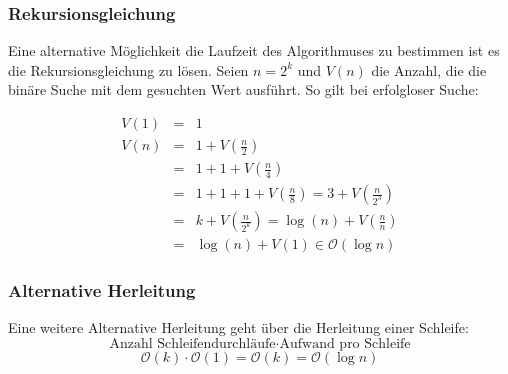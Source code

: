 \subsubsection{Rekursionsgleichung}
Eine alternative Möglichkeit die Laufzeit des Algorithmuses zu bestimmen ist es die Rekursionsgleichung zu lösen.
Seien \(n=2^{k}\) und \(V(n)\) die Anzahl, die die binäre Suche mit dem gesuchten Wert ausführt.
So gilt bei erfolgloser Suche:

\begin{eqnarray*}
	V(1) &=& 1 \\
	V(n) &=& 1+ V(\frac{n}{2}) \\
	&=& 1+1+V(\frac{n}{4}) \\
	&=& 1+1+1+V(\frac{n}{8}) = 3 +V(\frac{n}{2^{3}}) \\
	&=& k+V(\frac{n}{2^{k}}) = \log(n) + V(\frac{n}{n})\\
	&=& \log(n) + V(1) \in \mathcal{O}(\log n)
\end{eqnarray*}

\subsubsection{Alternative Herleitung}
Eine weitere Alternative Herleitung geht über die Herleitung einer Schleife:
\[ \textrm{Anzahl Schleifendurchläufe} \cdot \textrm{Aufwand pro Schleife} \]
\[ \mathcal{O}(k) \cdot \mathcal{O}(1) = \mathcal{O}(k) = \mathcal{O}(\log n) \]

